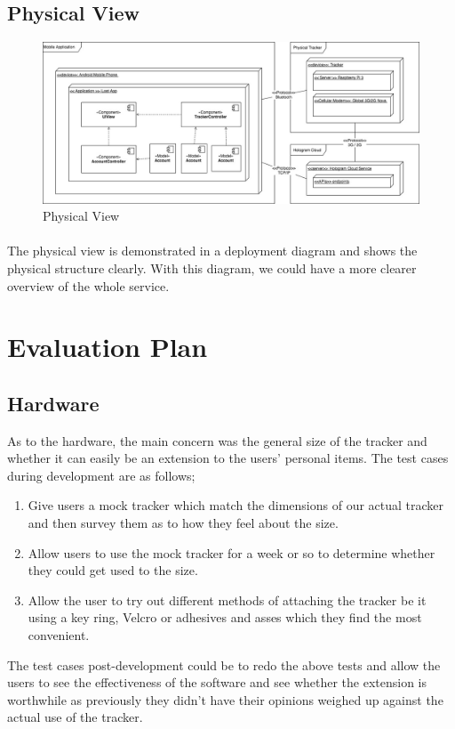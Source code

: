 \documentclass[12pt,a4paper]{article}
\begin{document}
      \subsection{Physical View}
        \begin{figure}[H]
          \centering
          \includegraphics[width=1\textwidth]{../assets/7-technical-architecture-physical.jpg}
          \caption{Physical View}
          \label{fig:Physical View}
        \end{figure}
        \paragraph{}
          The physical view is demonstrated in a deployment diagram and shows the physical structure clearly. With this diagram, we could have a more clearer overview of the whole service.
       
    \section{Evaluation Plan}
      \subsection{Hardware}
        As to the hardware, the main concern was the general size of the tracker and whether it can easily be an extension to the users’ personal items. The test cases during development are as follows;
        \begin{enumerate}
          \item Give users a mock tracker which match the dimensions of our actual tracker and then survey them as to how they feel about the size.
          \item Allow users to use the mock tracker for a week or so to determine whether they could get used to the size.
          \item Allow the user to try out different methods of attaching the tracker be it using a key ring, Velcro or adhesives and asses which they find the most convenient.
        \end{enumerate}
        The test cases post-development could be to redo the above tests and allow the users to see the effectiveness of the software and see whether the extension is worthwhile as previously they didn’t have their opinions weighed up against the actual use of the tracker.
      
\end{document}

